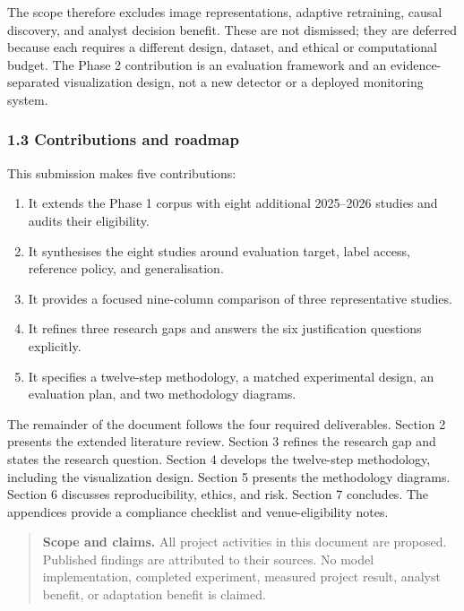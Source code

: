 \documentclass[
]{article}
\providecommand{\tightlist}{%
  \setlength{\itemsep}{0pt}\setlength{\parskip}{0pt}}
\begin{document}
The scope therefore excludes image representations, adaptive retraining,
causal discovery, and analyst decision benefit. These are not dismissed;
they are deferred because each requires a different design, dataset, and
ethical or computational budget. The Phase 2 contribution is an
evaluation framework and an evidence-separated visualization design, not
a new detector or a deployed monitoring system.

\hypertarget{contributions-and-roadmap}{%
\subsubsection{1.3 Contributions and
roadmap}\label{contributions-and-roadmap}}

This submission makes five contributions:

\begin{enumerate}
\def\labelenumi{\arabic{enumi}.}
\tightlist
\item
  It extends the Phase 1 corpus with eight additional 2025--2026 studies
  and audits their eligibility.
\item
  It synthesises the eight studies around evaluation target, label
  access, reference policy, and generalisation.
\item
  It provides a focused nine-column comparison of three representative
  studies.
\item
  It refines three research gaps and answers the six justification
  questions explicitly.
\item
  It specifies a twelve-step methodology, a matched experimental design,
  an evaluation plan, and two methodology diagrams.
\end{enumerate}

The remainder of the document follows the four required deliverables.
Section 2 presents the extended literature review. Section 3 refines the
research gap and states the research question. Section 4 develops the
twelve-step methodology, including the visualization design. Section 5
presents the methodology diagrams. Section 6 discusses reproducibility,
ethics, and risk. Section 7 concludes. The appendices provide a
compliance checklist and venue-eligibility notes.

\begin{quote}
\textbf{Scope and claims.} All project activities in this document are
proposed. Published findings are attributed to their sources. No model
implementation, completed experiment, measured project result, analyst
benefit, or adaptation benefit is claimed.
\end{quote}
\end{document}

